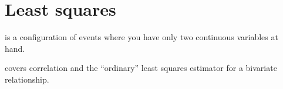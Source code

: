 %
%
\chapter{Least squares}%
  \label{ch:ols}%
  \startcontents[chapters]%
  \newpage

 is a configuration of events where you have only two continuous variables at hand.%

 covers correlation and the ``ordinary'' least squares estimator for a bivariate relationship.%

%
%
%
%
%
%
